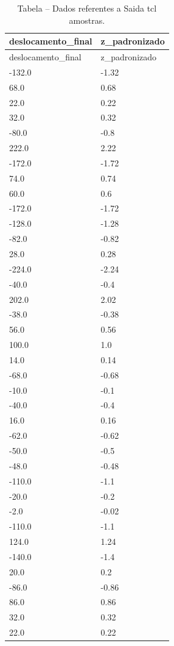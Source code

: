 \begingroup
\setlength{\LTpre}{0pt}
\setlength{\LTpost}{0pt}
\small
\begin{longtable}{ll}
\caption{Tabela – Dados referentes a Saida tcl amostras.}\label{tab:saida_tcl_amostras}\\
\toprule
deslocamento\_final & z\_padronizado \\
\midrule
\endfirsthead
\toprule
deslocamento\_final & z\_padronizado \\
\midrule
\endhead
-132.0 & -1.32 \\
68.0 & 0.68 \\
22.0 & 0.22 \\
32.0 & 0.32 \\
-80.0 & -0.8 \\
222.0 & 2.22 \\
-172.0 & -1.72 \\
74.0 & 0.74 \\
60.0 & 0.6 \\
-172.0 & -1.72 \\
-128.0 & -1.28 \\
-82.0 & -0.82 \\
28.0 & 0.28 \\
-224.0 & -2.24 \\
-40.0 & -0.4 \\
202.0 & 2.02 \\
-38.0 & -0.38 \\
56.0 & 0.56 \\
100.0 & 1.0 \\
14.0 & 0.14 \\
-68.0 & -0.68 \\
-10.0 & -0.1 \\
-40.0 & -0.4 \\
16.0 & 0.16 \\
-62.0 & -0.62 \\
-50.0 & -0.5 \\
-48.0 & -0.48 \\
-110.0 & -1.1 \\
-20.0 & -0.2 \\
-2.0 & -0.02 \\
-110.0 & -1.1 \\
124.0 & 1.24 \\
-140.0 & -1.4 \\
20.0 & 0.2 \\
-86.0 & -0.86 \\
86.0 & 0.86 \\
32.0 & 0.32 \\
22.0 & 0.22 \\

\end{longtable}
